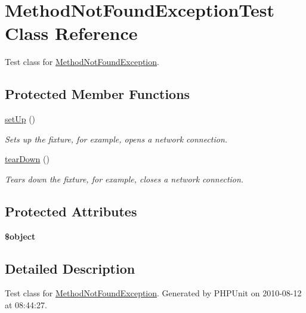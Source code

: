 \hypertarget{class_method_not_found_exception_test}{
\section{MethodNotFoundExceptionTest Class Reference}
\label{class_method_not_found_exception_test}
}


Test class for \hyperlink{class_method_not_found_exception}{MethodNotFoundException}.  


\subsection*{Protected Member Functions}
\begin{DoxyCompactItemize}
\item 
\hyperlink{class_method_not_found_exception_test_acddeb76ae3034cad8db221426dab8334}{setUp} ()
\begin{DoxyCompactList}\small\item\em Sets up the fixture, for example, opens a network connection. \item\end{DoxyCompactList}\item 
\hyperlink{class_method_not_found_exception_test_aae760cd35e2724c64675d3319aef2461}{tearDown} ()
\begin{DoxyCompactList}\small\item\em Tears down the fixture, for example, closes a network connection. \item\end{DoxyCompactList}\end{DoxyCompactItemize}
\subsection*{Protected Attributes}
\begin{DoxyCompactItemize}
\item 
\hypertarget{class_method_not_found_exception_test_aad9df5342f599cba1e630dd882b87bbd}{
{\bfseries \$object}}
\label{class_method_not_found_exception_test_aad9df5342f599cba1e630dd882b87bbd}

\end{DoxyCompactItemize}


\subsection{Detailed Description}
Test class for \hyperlink{class_method_not_found_exception}{MethodNotFoundException}. Generated by PHPUnit on 2010-\/08-\/12 at 08:44:27. 

